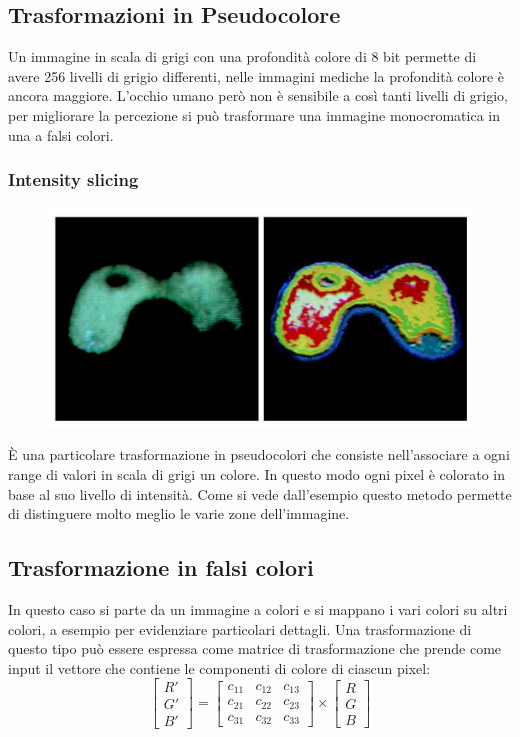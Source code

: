 \subsection{Trasformazioni in Pseudocolore}
Un immagine in scala di grigi con una profondità colore di 8 bit permette di avere 256 livelli di grigio differenti, nelle immagini mediche la profondità colore è ancora maggiore. L'occhio umano però non è sensibile a così tanti livelli di grigio, per migliorare la percezione si può trasformare una immagine monocromatica in una a falsi colori. 
\subsubsection{Intensity slicing}
\begin{figure}
	\centering
	\includegraphics[width=.9\linewidth]{Picture/Pseudocolor}
\end{figure}
È una particolare trasformazione in pseudocolori che consiste nell'associare a ogni range di valori in scala di grigi un colore. In questo modo ogni pixel è colorato in base al suo livello di intensità. Come si vede dall'esempio questo metodo permette di distinguere molto meglio le varie zone dell'immagine.
\subsection{Trasformazione in falsi colori}
In questo caso si parte da un immagine a colori e si mappano i vari colori su altri colori, a esempio per evidenziare particolari dettagli. Una trasformazione di questo tipo può essere espressa come matrice di trasformazione che prende come input il vettore che contiene le componenti di colore di ciascun pixel:
\begin{equation}
	\begin{bmatrix}
		R'\\
		G'\\
		B'
	\end{bmatrix}
	= 
	\begin{bmatrix}
		c_{11} & c_{12} & c_{13} \\
		c_{21} & c_{22} & c_{23} \\
		c_{31} & c_{32} & c_{33} 
	\end{bmatrix}
	\times
	\begin{bmatrix}
		R\\
		G\\
		B
	\end{bmatrix}
\end{equation}
